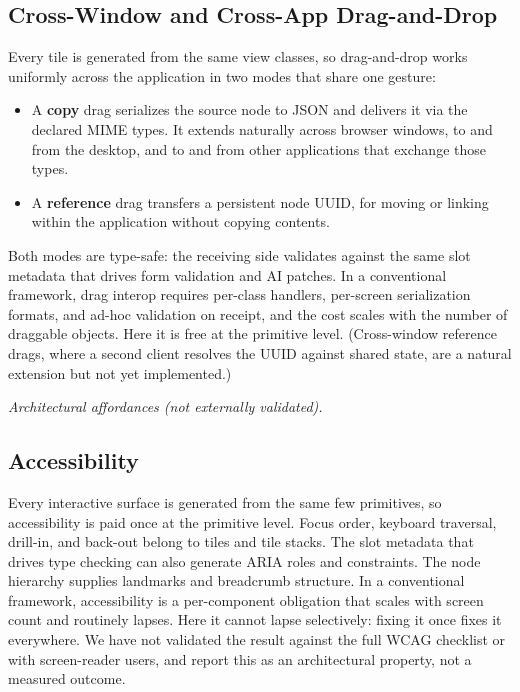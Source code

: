 \documentclass[sigplan,review,anonymous,10pt]{acmart}
\begin{document}
\subsection{Cross-Window and Cross-App Drag-and-Drop}
\label{sec:drag-drop}

Every tile is generated from the same view classes, so drag-and-drop works uniformly across the application in two modes that share one gesture:

\begin{itemize}
\item A \textbf{copy} drag serializes the source node to JSON and delivers it via the declared MIME types. It extends naturally across browser windows, to and from the desktop, and to and from other applications that exchange those types.
\item A \textbf{reference} drag transfers a persistent node UUID, for moving or linking within the application without copying contents.
\end{itemize}

Both modes are type-safe: the receiving side validates against the same slot metadata that drives form validation and AI patches. In a conventional framework, drag interop requires per-class handlers, per-screen serialization formats, and ad-hoc validation on receipt, and the cost scales with the number of draggable objects. Here it is free at the primitive level. (Cross-window reference drags, where a second client resolves the UUID against shared state, are a natural extension but not yet implemented.)

\medskip\noindent\textit{Architectural affordances (not externally validated).}

\subsection{Accessibility}
\label{sec:accessibility}

Every interactive surface is generated from the same few primitives, so accessibility is paid once at the primitive level. Focus order, keyboard traversal, drill-in, and back-out belong to tiles and tile stacks. The slot metadata that drives type checking can also generate ARIA roles and constraints. The node hierarchy supplies landmarks and breadcrumb structure. In a conventional framework, accessibility is a per-component obligation that scales with screen count and routinely lapses. Here it cannot lapse selectively: fixing it once fixes it everywhere. We have not validated the result against the full WCAG checklist or with screen-reader users, and report this as an architectural property, not a measured outcome.
\end{document}
